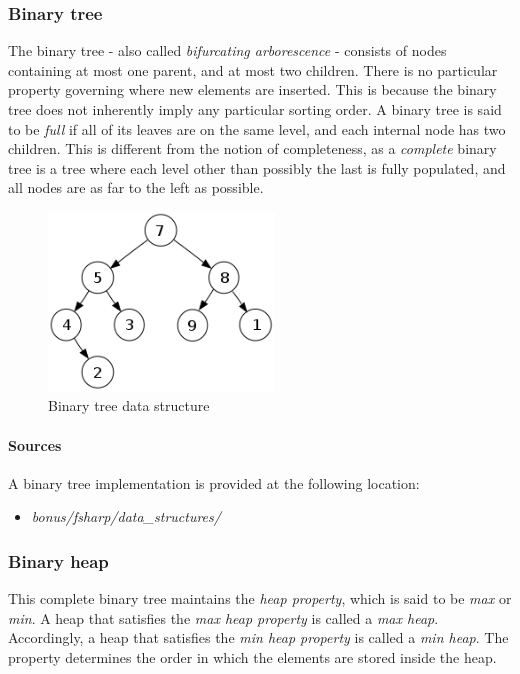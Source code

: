 \documentclass{article}
\begin{document}
{\begin{samepage}
\subsubsection{Binary tree}
The binary tree - also called {\em bifurcating arborescence} - consists of nodes containing at most one parent,
and at most two children. There is no particular property governing where new elements are inserted. This is because
the binary tree does not inherently imply any particular sorting order. A binary tree is said to be {\em full} if
all of its leaves are on the same level, and each internal node has two children. This is different from the notion
of completeness, as a {\em complete} binary tree is a tree where each level other than possibly the last is fully
populated, and all nodes are as far to the left as possible.

\begin{figure}[H]
  \centering
  \includegraphics[width=6cm]{binary_tree}
  \caption{Binary tree data structure}
\end{figure}

\paragraph{Sources}
A binary tree implementation is provided at the following location:
\begin{itemize}
  
\item{{\em bonus/fsharp/data\_structures/}}
\end{itemize}
\end{samepage}


\subsubsection{Binary heap}
This complete binary tree maintains the {\em heap property}, which is said to be {\em max} or {\em min}.
A heap that satisfies the {\em max heap property} is called a {\em max heap}.
Accordingly, a heap that satisfies the {\em min heap property} is called a {\em min heap}.
The property determines the order in which the elements are stored inside the heap.

}
\end{document}
